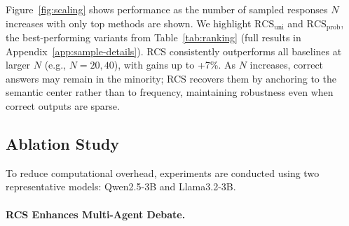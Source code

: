 Figure~\ref{fig:scaling} shows performance as the number of sampled responses $N$ increases with only top methods are shown. We highlight $\text{RCS}_{\text{uni}}$ and $\text{RCS}_{\text{prob}}$, the best-performing variants from Table~\ref{tab:ranking} (full results in Appendix~\ref{app:sample-details}).
RCS consistently outperforms all baselines at larger $N$ (e.g., $N{=}20,40$), with gains up to +7\%. As $N$ increases, correct answers may remain in the minority; RCS recovers them by anchoring to the semantic center rather than to frequency, maintaining robustness even when correct outputs are sparse.




\subsection{Ablation Study}\label{sec:ablation}

To reduce computational overhead, experiments are conducted using two representative models: Qwen2.5-3B and Llama3.2-3B.





\paragraph{RCS Enhances Multi-Agent Debate.}

